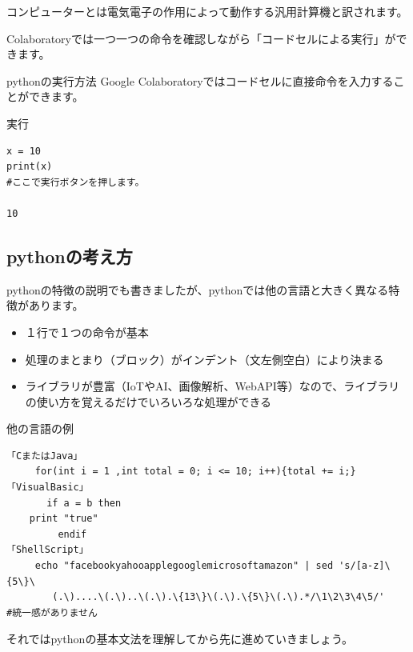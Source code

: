 \documentclass[11pt,a4paper,dvipdfmx,titlepage]{jsreport}
\begin{document}
 コンピューターとは電気電子の作用によって動作する汎用計算機と訳されます。
 
 Colaboratoryでは一つ一つの命令を確認しながら「コードセルによる実行」ができます。
 


\begin{pabox}{pythonの実行方法}
Google Colaboratoryではコードセルに直接命令を入力することができます。
\begin{grabox}{実行}
\begin{verbatim}
x = 10
print(x)
#ここで実行ボタンを押します。

10
\end{verbatim}
\end{grabox}

\end{pabox}
 
 
 
\subsection{pythonの考え方}
pythonの特徴の説明でも書きましたが、pythonでは他の言語と大きく異なる特徴があります。

\begin{itemize}
\item １行で１つの命令が基本
\item 処理のまとまり（ブロック）がインデント（文左側空白）により決まる
\item ライブラリが豊富（IoTやAI、画像解析、WebAPI等）なので、ライブラリの使い方を覚えるだけでいろいろな処理ができる
\end{itemize}

\begin{pabox}{他の言語の例}
\begin{verbatim}
「CまたはJava」
     for(int i = 1 ,int total = 0; i <= 10; i++){total += i;}
「VisualBasic」
       if a = b then
    print "true"
         endif
「ShellScript」
     echo "facebookyahooapplegooglemicrosoftamazon" | sed 's/[a-z]\{5\}\
        (.\)....\(.\)..\(.\).\{13\}\(.\).\{5\}\(.\).*/\1\2\3\4\5/'
#統一感がありません
\end{verbatim}
\end{pabox}

それではpythonの基本文法を理解してから先に進めていきましょう。
\end{document}
